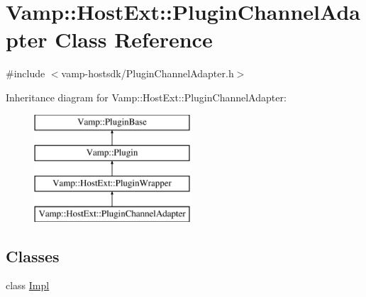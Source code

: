 \hypertarget{class_vamp_1_1_host_ext_1_1_plugin_channel_adapter}{}\section{Vamp\+:\+:Host\+Ext\+:\+:Plugin\+Channel\+Adapter Class Reference}
\label{class_vamp_1_1_host_ext_1_1_plugin_channel_adapter}


{\ttfamily \#include $<$vamp-\/hostsdk/\+Plugin\+Channel\+Adapter.\+h$>$}

Inheritance diagram for Vamp\+:\+:Host\+Ext\+:\+:Plugin\+Channel\+Adapter\+:\begin{figure}[H]
\begin{center}
\leavevmode
\includegraphics[height=4.000000cm]{class_vamp_1_1_host_ext_1_1_plugin_channel_adapter}
\end{center}
\end{figure}
\subsection*{Classes}
\begin{DoxyCompactItemize}
\item 
class \hyperlink{class_vamp_1_1_host_ext_1_1_plugin_channel_adapter_1_1_impl}{Impl}
\end{DoxyCompactItemize}

